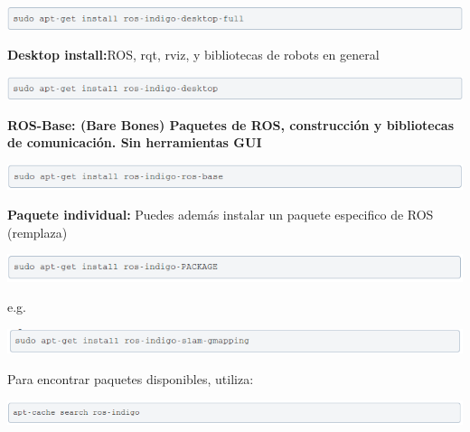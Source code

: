 \documentclass[a4paper,usenames,dvipsnames,svgnames,table]{book}
\begin{document}
\begin{center}
\includegraphics[width=1\textwidth]{Figures/Software/Install_ROS/Paso_7.png}
\end{center}

\textbf{Desktop install:}ROS, rqt, rviz, y bibliotecas de robots en general

\begin{center}
\includegraphics[width=1\textwidth]{Figures/Software/Install_ROS/Paso_8.png}
\end{center}

\textbf{ROS-Base: (Bare Bones) Paquetes de ROS, construcción y bibliotecas de comunicación. Sin herramientas GUI}

\begin{center}
\includegraphics[width=1\textwidth]{Figures/Software/Install_ROS/Paso_9.png}
\end{center}

\textbf{Paquete individual:} Puedes además instalar un paquete especifico de ROS (remplaza)

\begin{center}
\includegraphics[width=1\textwidth]{Figures/Software/Install_ROS/Paso_10.png}
\end{center}

e.g.

\begin{center}
\includegraphics[width=1\textwidth]{Figures/Software/Install_ROS/Paso_11.png}
\end{center}

Para encontrar paquetes disponibles, utiliza:

\begin{center}
\includegraphics[width=1\textwidth]{Figures/Software/Install_ROS/Paso_12.png}
\end{center}
\end{document}
